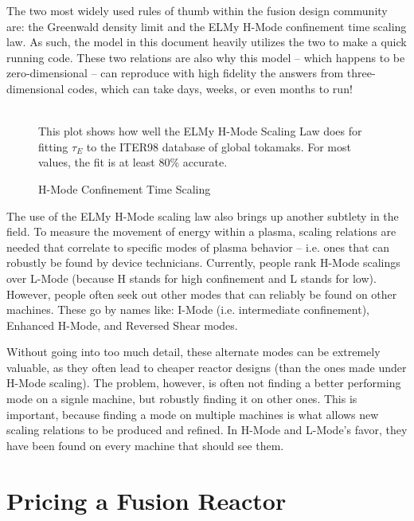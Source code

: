 The two most widely used rules of thumb within the fusion design community are: the Greenwald density limit and the ELMy H-Mode confinement time scaling law. As such, the model in this document heavily utilizes the two to make a quick running code. These two relations are also why this model -- which happens to be zero-dimensional -- can reproduce with high fidelity the answers from three-dimensional codes, which can take days, weeks, or even months to run!

\begin{figure}
	\centering
	\begin{adjustbox}{width=0.75\textwidth}
		
	\end{adjustbox}
	\caption{H-Mode Confinement Time Scaling} ~\\
	\small This plot shows how well the ELMy H-Mode Scaling Law does for fitting $\tau_E$ to the ITER98 database of global tokamaks. For most values, the fit is at least 80\% accurate.
\end{figure}

The use of the ELMy H-Mode scaling law also brings up another subtlety in the field. To measure the movement of energy within a plasma, scaling relations are needed that correlate to specific modes of plasma behavior -- i.e. ones that can robustly be found by device technicians. Currently, people rank H-Mode scalings over L-Mode (because H stands for high confinement and L stands for low). However, people often seek out other modes that can reliably be found on other machines. These go by names like: I-Mode (i.e. intermediate confinement), Enhanced H-Mode, and Reversed Shear modes. \cite{imode,enhanced,shear}

Without going into too much detail, these alternate modes can be extremely valuable, as they often lead to cheaper reactor designs (than the ones made under H-Mode scaling). The problem, however, is often not finding a better performing mode on a signle machine, but robustly finding it on other ones. This is important, because finding a mode on multiple machines is what allows new scaling relations to be produced and refined. In H-Mode and L-Mode's favor, they have been found on every machine that should see them.

\section{Pricing a Fusion Reactor}

